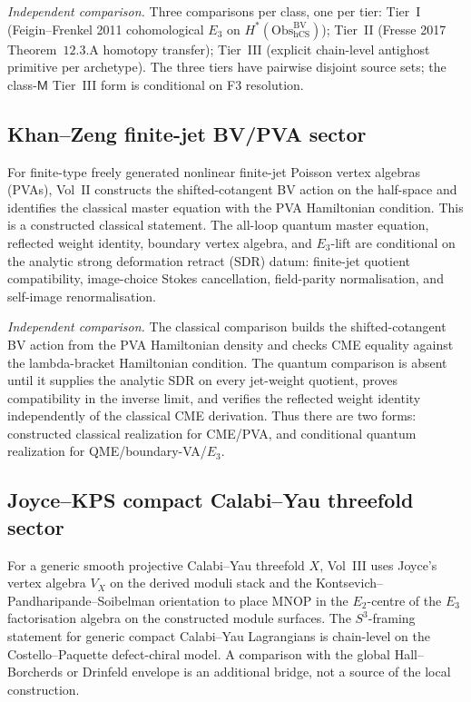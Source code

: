 \noindent\emph{Independent comparison.} Three comparisons per class, one
per tier: Tier~I (Feigin--Frenkel 2011 cohomological \(E_3\) on
\(H^\ast(\mathrm{Obs}_{\mathrm{hCS}}^{\mathrm{BV}})\)); Tier~II (Fresse 2017
Theorem~\(12.3.\mathrm{A}\) homotopy transfer); Tier~III (explicit
chain-level antighost primitive per archetype). The three tiers have
pairwise disjoint source sets; the class-\(\mathsf M\) Tier~III form is
conditional on F3
resolution.

\subsection{Khan--Zeng finite-jet BV/PVA sector}
\label{v4-subsec:khan-zeng-finite-jet-sector}

For finite-type freely generated nonlinear finite-jet Poisson vertex
algebras (PVAs), Vol~II
constructs the shifted-cotangent BV action on the half-space and
identifies the classical master equation with the PVA Hamiltonian
condition. This is a constructed classical statement. The all-loop
quantum master equation, reflected weight identity, boundary vertex
algebra, and \(E_3\)-lift are conditional on the analytic strong
deformation retract (SDR) datum: finite-jet quotient compatibility,
image-choice Stokes cancellation, field-parity normalisation, and
self-image renormalisation.

\noindent\emph{Independent comparison.} The classical comparison builds
the shifted-cotangent BV action from the PVA Hamiltonian density and
checks CME equality against the lambda-bracket Hamiltonian condition.
The quantum comparison is absent until it supplies
the analytic SDR on every jet-weight quotient, proves compatibility
in the inverse limit, and verifies the reflected weight identity
independently of the classical CME derivation. Thus there are
two forms: constructed classical realization for CME/PVA, and
conditional quantum realization for QME/boundary-VA/\(E_3\).

\subsection{Joyce--KPS compact Calabi--Yau threefold sector}
\label{v4-subsec:joyce-kps-compact-cy3}

For a generic smooth projective Calabi--Yau threefold \(X\), Vol~III
uses Joyce's vertex algebra \(V_X\) on the derived moduli stack and
the Kontsevich--Pandharipande--Soibelman orientation to place MNOP in
the \(E_2\)-centre of the \(E_3\) factorisation algebra on the
constructed module surfaces. The \(S^3\)-framing statement for
generic compact Calabi--Yau Lagrangians is chain-level on the
Costello--Paquette defect-chiral model. A comparison with the global
Hall--Borcherds or Drinfeld envelope is an additional bridge, not a
source of the local construction.

